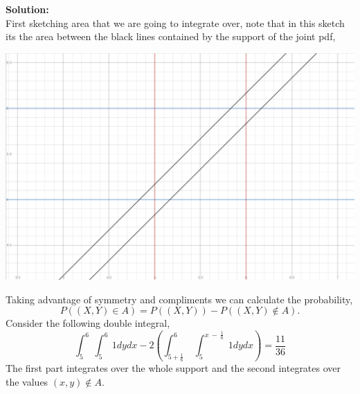 \documentclass[12pt]{article}
\makeatletter
\theoremstyle{homework}
\newenvironment{exercise}[1]
{\def\@currentlabel{#1}\exercisecore}
{\endexercisecore}
\newcommand{\localhead}[1]{\par\smallskip\noindent\textbf{#1}\nobreak\\}%
\newcommand\solution{\localhead{Solution:}}
\makeatother
\begin{document}
\begin{exercise}{5.10}
\begin{enumerate}
    \solution First sketching area that we are going to integrate over, note that in this sketch its the area between the black lines contained by the support of the joint pdf,
    \begin{center}
      \includegraphics[width = \textwidth]{plotsketch.png}
    \end{center}
    Taking advantage of symmetry and compliments we can calculate the probability,
    \begin{equation*}
      P((X,Y) \in A) = P((X,Y)) - P((X,Y)\notin A).
    \end{equation*}
    Consider the following double integral,
    \begin{equation*}
      \int _5^6\:\int _5^6\:1dydx-2\left(\int _{5+\frac{1}{6}}^6\:\int _5^{x\:-\:\frac{1}{6}}\:1dydx\right) = \dfrac{11}{36}
    \end{equation*}
    The first part integrates over the whole support and the second integrates over the values $(x,y) \notin A$.
  \end{enumerate}
\end{exercise}
\end{document}

